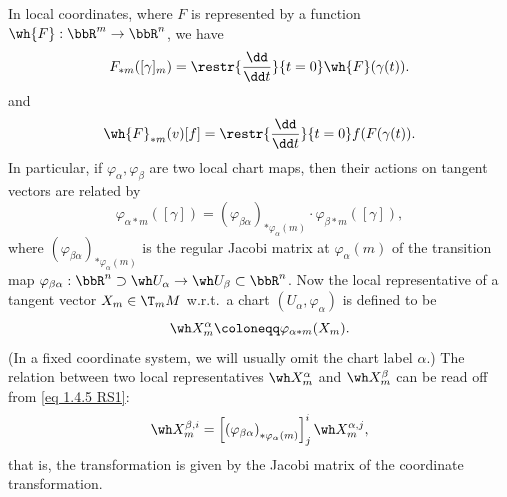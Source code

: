 \begin{rem}
    In local coordinates, where $F$ is represented by a function $\wh{F}:\bbR^m\to\bbR^n$, we have
    \[F_{\ast m}([\gamma]_m)=\restr{\frac{\dd}{\dd t}}{t=0} \wh{F}(\gamma(t)).\label{eq differential in local coordinates}\]
    and 
    \[\wh{F}_{\ast m}(v)[f]=\restr{\frac{\dd}{\dd t}}{t=0}f(F(\gamma(t)).\]
    In particular, if $\varphi_\alpha,\varphi_\beta$ are two local chart maps, then their actions on tangent vectors are related by
    \[\varphi_{\alpha\ast m}([\gamma])=\left(\varphi_{\beta\alpha}\right)_{\ast \varphi_\alpha(m)}\cdot \varphi_{\beta\ast m}([\gamma]),\label{eq 1.4.5 RS1}\]
    where $\left(\varphi_{\beta\alpha}\right)_{\ast \varphi_\alpha(m)}$ is the regular Jacobi matrix at $\varphi_\alpha(m)$ of the transition map $\varphi_{\beta\alpha}:\bbR^n\supset \wh U_\alpha\to \wh U_\beta\subset\bbR^n$. Now the local representative of a tangent vector $X_m\in \T_m M$ w.r.t.\ a chart $(U_\alpha,\varphi_\alpha)$ is defined to be 
    \[\wh X^\alpha_m\coloneqq \varphi_{\alpha\ast m}(X_m).\label{eq 1.4.8 RS1}\]
    (In a fixed coordinate system, we will usually omit the chart label $\alpha$.) The relation between two local representatives $\wh X^\alpha_m$ and $\wh X^\beta_m$ can be read off from \eqref{eq 1.4.5 RS1}:
    \[\wh X^{\beta,i}_m=\left[\left(\varphi_{\beta\alpha}\right)_{\ast \varphi_\alpha(m)}\right]^i_j \wh X^{\alpha,j}_m,\label{eq 1.4.9 RS1}\]
    that is, the transformation is given by the Jacobi matrix of the coordinate transformation.
\end{rem}


